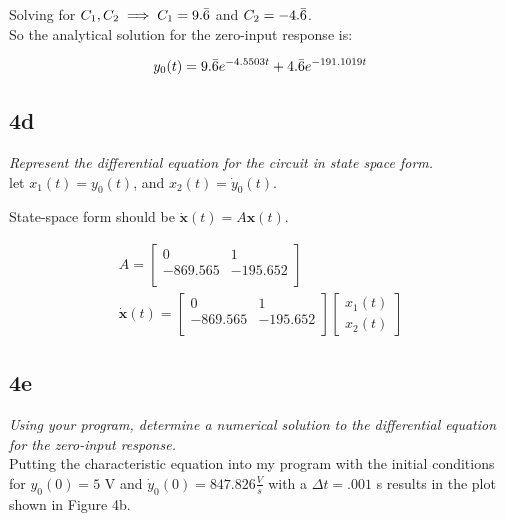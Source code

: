 \documentclass[10pt, AMS Euler]{article}
\begin{document}
Solving for $C_1, C_2 \implies C_1 = 9.\Bar{6}$ and $C_2 = -4.\Bar{6}$. \\

So the analytical solution for the zero-input response is: 
\begin{center}
    \begin{align*}
        y_0(t) = 9.\Bar{6}e^{-4.5503t} + 4.\Bar{6}e^{-191.1019t}
    \end{align*}
\end{center}

\subsection*{4d}
\textit{Represent the differential equation for the circuit in state space form.}\\

let $x_1(t) = y_0(t)$, and $x_2(t) = \dot{y}_0(t)$.

State-space form should be $\dot{\boldsymbol{x}}(t) = A\boldsymbol{x}(t)$.

\begin{center}
    \begin{align*}
        A = \begin{bmatrix}
        0 & 1\\
        -869.565 & -195.652\\
        \end{bmatrix}\\
        \dot{\boldsymbol{x}}(t) = 
        \begin{bmatrix}
        0 & 1\\
        -869.565 & -195.652\\
        \end{bmatrix}
        \begin{bmatrix}
        x_1(t)\\
        x_2(t)
        \end{bmatrix}
    \end{align*}
\end{center}

\subsection*{4e}
\textit{Using your program, determine a numerical solution to the differential equation for the zero-input
response.}\\

Putting the characteristic equation into my program with the initial conditions for $y_0(0) = 5$ V and $\dot{y}_0(0) = 847.826 \frac{V}{s}$ with a $\Delta t = .001$ s results in the plot shown in Figure 4b.
\end{document}

